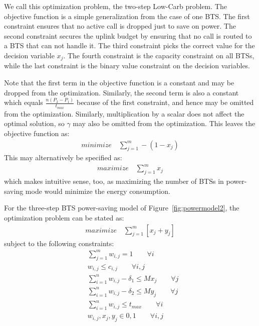 We call this optimization problem, the two-step Low-Carb problem. The objective function is a simple generalization from the case
of one BTS. The first constraint ensures that no active call is
dropped just to save on power. The second constraint secures
the uplink budget by ensuring that no call is routed to a BTS
that can not handle it. The third constraint picks the correct
value for the decision variable $x_j$. The fourth constraint is the capacity constraint on all BTSs, while the last
constraint is the binary value constraint on the decision
variables.

Note that the first term in the objective function is a constant and may be dropped from the optimization. Similarly, the second term is also a constant which equals $\frac{n(P_2-P_1)}{t_{max}}$ because of the first constraint, and hence may be omitted from the optimization. Similarly, multiplication by a scalar does not affect the optimal solution, so $\gamma$ may also be omitted from the optimization. This leaves the objective function as:
\begin{align}
\textit{minimize} \quad \sum_{j=1}^{m} -(1-x_j)
\end{align}
This may alternatively be specified as:
\begin{align}
\textit{maximize} \quad \sum_{j=1}^{m} x_j
\end{align}
which makes intuitive sense, too, as maximizing the number of BTSs in power-saving mode would minimize the energy consumption.


For the three-step BTS power-saving model of Figure~\ref{fig:powermodel2}, the optimization problem can be stated as:
\begin{align}
\textit{maximize} \quad \sum_{j=1}^{m} \left[
x_j+y_j
\right]
\end{align}
subject to the following constraints:
\begin{align}
& \sum_{j=1}^m w_{i,j} = 1 \qquad \forall i \\
& w_{i,j} \leq c_{i,j} \qquad \forall i, j \\
& \sum_{i=1}^nw_{i,j}-\delta_1 \leq Mx_j \qquad \forall j\\
& \sum_{i=1}^nw_{i,j}-\delta_2 \leq My_j \qquad \forall j\\
& \sum_{i=1}^n w_{i,j} \le t_{max} \qquad \forall i \\
& w_{i,j}, x_j, y_j\in {0,1} \qquad \forall i, j%
\end{align}

